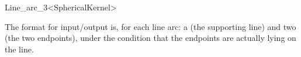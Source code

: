 \begin{ccRefClass}{Line_arc_3<SphericalKernel>}

\ccGlue
{}

The format for input/output is, for each line arc: a  
(the supporting line) and two  (the two endpoints), 
under the condition that the endpoints are actually lying on the line.

\ccSeeAlso

\\

\end{ccRefClass}

